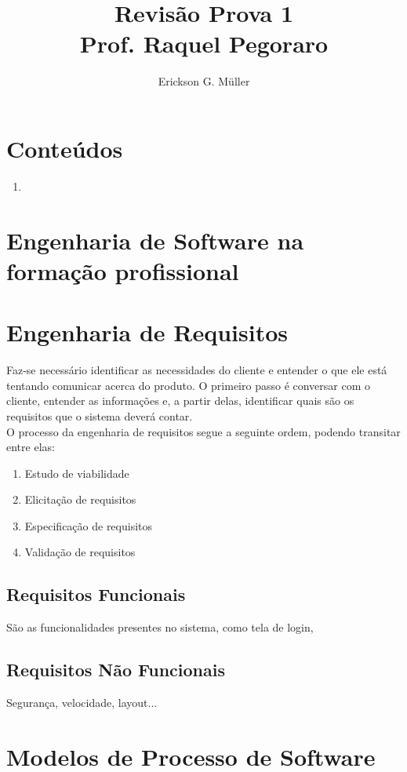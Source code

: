 \documentclass[ ]{article}
\title{Revisão Prova 1\\ Prof. Raquel Pegoraro}
\author{Erickson G. Müller}
\begin{document}
	\maketitle
	\newpage
	\section*{Conteúdos}
		\begin{enumerate}
			\item 
		\end{enumerate}
	\section{Engenharia de Software na formação profissional}
	
	
	
	
	
	\section{Engenharia de Requisitos}
		Faz-se necessário identificar as necessidades do cliente e entender o que ele está tentando comunicar acerca do produto. O primeiro passo é conversar com o cliente, entender as informações e, a partir delas, identificar quais são os requisitos que o sistema deverá contar.\\
		O processo da engenharia de requisitos segue a seguinte ordem, podendo transitar entre elas:
		\begin{enumerate}
			\item Estudo de viabilidade
			\item Elicitação de requisitos
			\item Especificação de requisitos
			\item Validação de requisitos
		\end{enumerate}
		\subsection{Requisitos Funcionais}
			São as funcionalidades presentes no sistema, como tela de login, 
		\subsection{Requisitos Não Funcionais}
			Segurança, velocidade, layout...
		
		
		
		
		
		
		
	\section{Modelos de Processo de Software}
\end{document}
